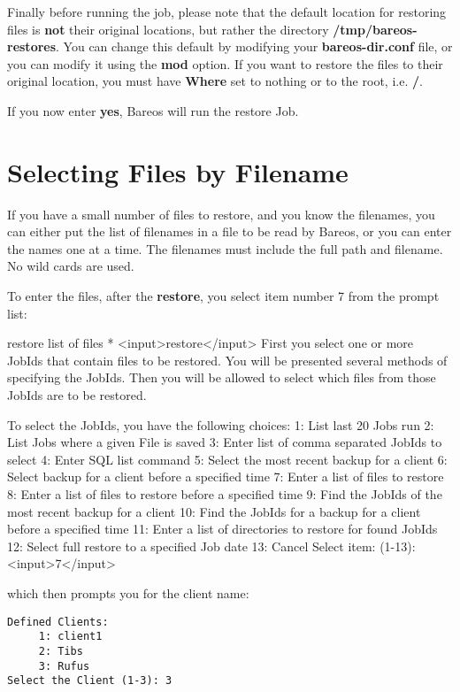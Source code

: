 Finally before running the job, please note that the default location for
restoring files is {\bf not} their original locations, but rather the directory
{\bf /tmp/bareos-restores}. You can change this default by modifying your {\bf
bareos-dir.conf} file, or you can modify it using the {\bf mod} option. If you
want to restore the files to their original location, you must have {\bf
Where} set to nothing or to the root, i.e. {\bf /}.

If you now enter {\bf yes}, Bareos will run the restore Job.


\section{Selecting Files by Filename}


If you have a small number of files to restore, and you know the filenames,
you can either put the list of filenames in a file to be read by Bareos, or
you can enter the names one at a time. The filenames must include the full
path and filename. No wild cards are used.

To enter the files, after the {\bf restore}, you select item number 7 from the
prompt list:

\begin{bconsole}{restore list of files}
* <input>restore</input>
First you select one or more JobIds that contain files
to be restored. You will be presented several methods
of specifying the JobIds. Then you will be allowed to
select which files from those JobIds are to be restored.

To select the JobIds, you have the following choices:
     1: List last 20 Jobs run
     2: List Jobs where a given File is saved
     3: Enter list of comma separated JobIds to select
     4: Enter SQL list command
     5: Select the most recent backup for a client
     6: Select backup for a client before a specified time
     7: Enter a list of files to restore
     8: Enter a list of files to restore before a specified time
     9: Find the JobIds of the most recent backup for a client
    10: Find the JobIds for a backup for a client before a specified time
    11: Enter a list of directories to restore for found JobIds
    12: Select full restore to a specified Job date
    13: Cancel
Select item:  (1-13): <input>7</input>
\end{bconsole}


which then prompts you for the client name:

\footnotesize
\begin{verbatim}
Defined Clients:
     1: client1
     2: Tibs
     3: Rufus
Select the Client (1-3): 3
\end{verbatim}
\normalsize

